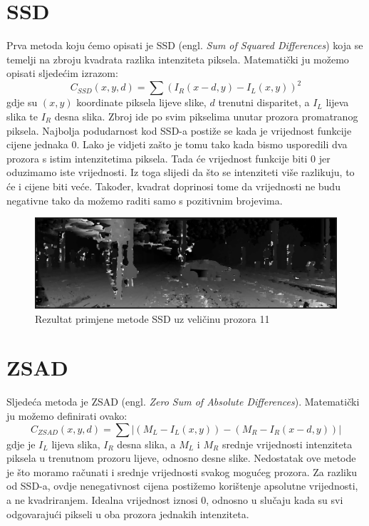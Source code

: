 \documentclass[utf8, zavrsni, numeric]{fer}
\begin{document}
\section{SSD}

Prva metoda koju ćemo opisati je SSD ({engl. \sl Sum of Squared Differences}) koja se temelji na zbroju kvadrata razlika intenziteta piksela.
Matematički ju možemo opisati sljedećim izrazom:
\[
C_{SSD}(x, y, d) = \sum(I_R(x - d, y) - I_L(x, y))^2
\]
gdje su $(x, y)$ koordinate piksela lijeve slike, $d$ trenutni disparitet, a $I_L$ lijeva slika te $I_R$ desna slika. Zbroj ide po svim pikselima unutar prozora promatranog piksela.
Najbolja podudarnost kod SSD-a postiže se kada je vrijednost funkcije cijene jednaka $0$. Lako je vidjeti zašto je tomu tako kada bismo usporedili dva prozora s istim intenzitetima piksela. Tada će vrijednost funkcije biti $0$ jer oduzimamo iste vrijednosti. Iz toga slijedi da što se intenziteti više razlikuju, to će i cijene biti veće. Također, kvadrat doprinosi tome da vrijednosti ne budu negativne tako da možemo raditi samo s pozitivnim brojevima.

\begin{figure}[htb]
  \centering
  \includegraphics[width=14cm]{img/local_000046_10_SSD_11_140_scaled.png}
  \caption{Rezultat primjene metode SSD uz veličinu prozora 11}
  \label{fig:SSD-KITTI}
\end{figure}

\section{ZSAD}

Sljedeća metoda je ZSAD ({engl. \sl Zero Sum of Absolute Differences}). Matematički ju možemo definirati ovako:
\[
C_{ZSAD}(x, y, d) = \sum\lvert(M_L - I_L(x, y)) - (M_R - I_R(x - d, y))\rvert
\]
gdje je $I_L$ lijeva slika, $I_R$ desna slika, a $M_L$ i $M_R$ srednje vrijednosti intenziteta piksela u trenutnom prozoru lijeve, odnosno desne slike.
Nedostatak ove metode je što moramo računati i srednje vrijednosti svakog mogućeg prozora. Za razliku od SSD-a, ovdje nenegativnost cijena postižemo korištenje apsolutne vrijednosti, a ne kvadriranjem. Idealna vrijednost iznosi 0, odnosno u slučaju kada su svi odgovarajući pikseli u oba
prozora jednakih intenziteta.
\end{document}
